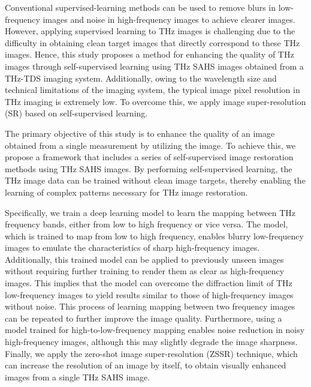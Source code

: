 Conventional supervised-learning methods can be used to remove blurs in low-frequency images and noise in high-frequency images to achieve clearer images. However, applying supervised learning to THz images is challenging due to the difficulty in obtaining clean target images that directly correspond to these THz images. Hence, this study proposes a method for enhancing the quality of THz images through self-supervised learning using THz SAHS images obtained from a THz-TDS imaging system. Additionally, owing to the wavelength size and technical limitations of the imaging system, the typical image pixel resolution in THz imaging is extremely low. To overcome this, we apply image super-resolution (SR) based on self-supervised learning.

The primary objective of this study is to enhance the quality of an image obtained from a single measurement by utilizing the image. To achieve this, we propose a framework that includes a series of self-supervised image restoration methods using THz SAHS images. By performing self-supervised learning, the THz image data can be trained  without clean image targets, thereby enabling the learning of complex patterns necessary for THz image restoration.

Specifically, we train a deep learning model to learn the mapping between THz frequency bands, either from low to high frequency or vice versa. The model, which is trained to map from low to high frequency, enables blurry low-frequency images to emulate the characteristics of sharp high-frequency images. Additionally, this trained model can be applied to previously unseen images without requiring further training to render them as clear as high-frequency images. This implies that the model can overcome the diffraction limit of THz low-frequency images to yield results similar to those of high-frequency images without noise. This process of learning mapping between two frequency images can be repeated to further improve the image quality. Furthermore, using a model trained for high-to-low-frequency mapping enables noise reduction in noisy high-frequency images, although this may slightly degrade the image sharpness. Finally, we apply the zero-shot image super-resolution (ZSSR) technique, which can increase the resolution of an image by itself, to obtain visually enhanced images from a single THz SAHS image.


